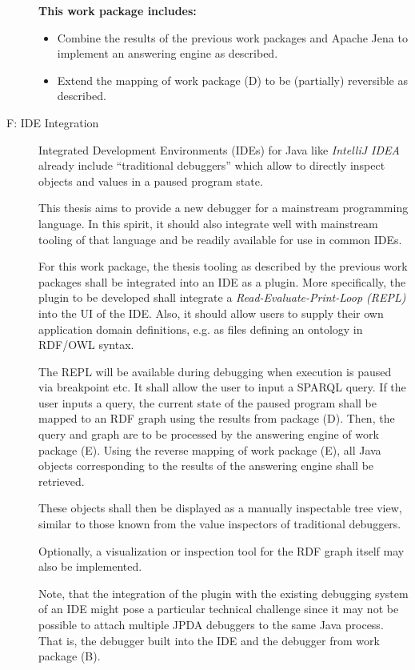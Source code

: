 \documentclass[
	english,
	accentcolor=9c,%
  marginpar=0cm %
	]{tudapub}
\begin{document}
\begin{description}
    \textbf{This work package includes:}
    \begin{itemize}
      \item Combine the results of the previous work packages and Apache Jena
        to implement an answering engine as described.
      \item Extend the mapping of work package (D) to be (partially)
        reversible as described.
    \end{itemize}
  \item[F: IDE Integration]
    Integrated Development Environments (IDEs) for Java like
    \emph{IntelliJ IDEA}~\cite{idea} already include
    \enquote{traditional debuggers} which allow to directly inspect objects and
    values in a paused program state.

    This thesis aims to provide a new debugger for a mainstream programming
    language. In this spirit, it should also integrate well with mainstream
    tooling of that language and be readily available for use in common IDEs.

    For this work package, the thesis tooling as described by the previous
    work packages shall be integrated into an IDE as a plugin.
    More specifically, the plugin to be developed shall integrate a
    \emph{Read-Evaluate-Print-Loop (REPL)} into the UI of the IDE.
    Also, it should allow users to supply their own application domain
    definitions, e.g. as files defining an ontology in RDF/OWL syntax.

    The REPL will be available during debugging when execution is paused
    via breakpoint etc.
    It shall allow the user to input a SPARQL query.
    If the user inputs a query, the current state of the paused program shall
    be mapped to an RDF graph using the results from package (D).
    Then, the query and graph are to be processed by the answering engine of
    work package (E).
    Using the reverse mapping of work package (E), all Java objects
    corresponding to the results of the answering engine shall be retrieved.

    These objects shall then be displayed as a manually inspectable tree view,
    similar to those known from the value inspectors of traditional debuggers.

    Optionally, a visualization or inspection tool for the RDF graph itself may
    also be implemented.

    Note, that the integration of the plugin with the existing debugging system of an IDE
    might pose a particular technical challenge since it may not be possible to
    attach multiple JPDA debuggers to the same Java process.
    That is, the debugger built into the IDE and the debugger from work package (B).


\end{description}
\end{document}
